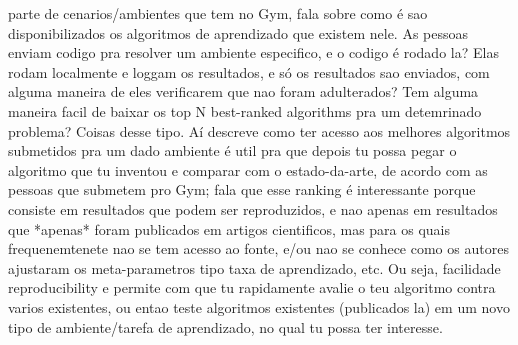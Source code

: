\documentclass[cic,tc]{iiufrgs}
\newcommand\bruno[1]{\textcolor{magenta}{#1}}
\begin{document}
{           parte de cenarios/ambientes que tem no Gym, fala sobre como é
           sao disponibilizados os algoritmos de aprendizado que existem
           nele. As pessoas enviam codigo pra resolver um ambiente especifico,
            e o codigo é rodado la? Elas rodam localmente e loggam os resultados,
             e só os resultados sao enviados, com alguma maneira de eles
             verificarem que nao foram adulterados? Tem alguma maneira facil
             de baixar os top N best-ranked algorithms pra um detemrinado
             problema? Coisas desse tipo. Aí descreve como ter acesso aos melhores algoritmos submetidos pra um dado ambiente é util pra que depois tu possa pegar o algoritmo que tu inventou e comparar com o estado-da-arte, de acordo com as pessoas que submetem pro Gym; fala que esse ranking é interessante porque consiste em resultados que podem ser reproduzidos, e nao apenas em resultados que *apenas* foram publicados em artigos cientificos, mas para os quais frequenemtenete nao se tem acesso ao fonte, e/ou nao se conhece como os autores ajustaram os meta-parametros tipo taxa de aprendizado, etc. Ou seja, facilidade reproducibility e permite com que tu rapidamente avalie o teu algoritmo contra varios existentes, ou entao teste algoritmos existentes (publicados la) em um novo tipo de ambiente/tarefa de aprendizado, no qual tu possa ter interesse}.\par
%
\end{document}
